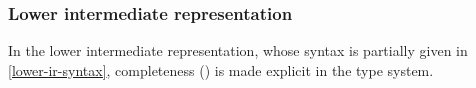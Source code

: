 \documentclass[index.tex]{subfiles}
\begin{document}
\newcommand{\EPlusNC}[2]{\ensuremath{#1 \SyPlus_{\CNC} #2}}
\newcommand{\EPlusNI}[2]{\ensuremath{#1 \SyPlus_{\CNI} #2}}
\newcommand{\ETimesNC}[2]{\ensuremath{#1 \SyTimes_{\CNC} #2}}
\newcommand{\ETimesNI}[2]{\ensuremath{#1 \SyTimes_{\CNI} #2}}
\newcommand{\EFPlusNC}[2]{\ensuremath{#1 \SyFPlus_{\CNC} #2}}
\newcommand{\EFPlusNI}[2]{\ensuremath{#1 \SyFPlus_{\CNI} #2}}
\newcommand{\EFTimesNC}[2]{\ensuremath{#1 \SyFTimes_{\CNC} #2}}
\newcommand{\EFTimesNI}[2]{\ensuremath{#1 \SyFTimes_{\CNI} #2}}

\newcommand{\ETrue}{\ensuremath{\SyTrue}}
\newcommand{\EEHole}[2]{\ensuremath{\SyEHole{#1}{#2}}}

\newcommand{\EVarNamed}[2]{\ensuremath{t_{#1}^{{\color{gray}#2}}}}

\subsubsection{Lower intermediate representation}
In the lower intermediate representation, whose syntax is partially given in \cref{lower-ir-syntax},
completeness () is made explicit in the type system.
\end{document}
